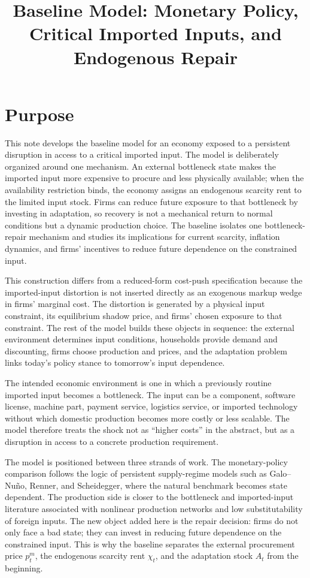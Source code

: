﻿\documentclass[12pt]{article}
\title{Baseline Model: Monetary Policy, Critical Imported Inputs, and Endogenous Repair}
\author{}
\date{}
\theoremstyle{remark}
\begin{document}
\maketitle

\section{Purpose}

This note develops the baseline model for an economy exposed to a persistent disruption in access
to a critical imported input. The model is deliberately organized around one mechanism. An external
bottleneck state makes the imported input more expensive to procure and less physically available;
when the availability restriction binds, the economy assigns an endogenous scarcity rent to the
limited input stock. Firms can reduce future exposure to that bottleneck by investing in
adaptation, so recovery is not a mechanical return to normal conditions but a dynamic production
choice. The baseline isolates one bottleneck-repair mechanism and studies its implications for
current scarcity, inflation dynamics, and firms' incentives to reduce future dependence on the
constrained input.

This construction differs from a reduced-form cost-push specification because the imported-input
distortion is not inserted directly as an exogenous markup wedge in firms' marginal cost. The
distortion is generated by a physical input constraint, its equilibrium shadow price, and firms'
chosen exposure to that constraint. The rest of the model builds these objects in sequence: the
external environment determines input conditions, households provide demand and discounting, firms
choose production and prices, and the adaptation problem links today's policy stance to tomorrow's
input dependence.

The intended economic environment is one in which a previously routine imported input becomes a
bottleneck. The input can be a component, software license, machine part, payment service,
logistics service, or imported technology without which domestic production becomes more costly or
less scalable. The model therefore treats the shock not as ``higher costs'' in the abstract, but as
a disruption in access to a concrete production requirement.

The model is positioned between three strands of work. The monetary-policy comparison follows the
logic of persistent supply-regime models such as Galo--Nu\~no, Renner, and Scheidegger, where the
natural benchmark becomes state dependent. The production side is closer to the bottleneck and
imported-input literature associated with nonlinear production networks and low substitutability of
foreign inputs. The new object added here is the repair decision: firms do not only face a bad
state; they can invest in reducing future dependence on the constrained input. This is why the
baseline separates the external procurement price $p_t^m$, the endogenous scarcity rent $\chi_t$,
and the adaptation stock $A_t$ from the beginning.
\end{document}
